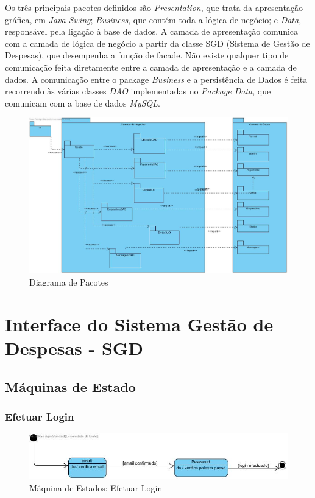 \newpage

Os três principais pacotes definidos são \textit{Presentation}, que trata da apresentação gráfica, em \textit{Java Swing}; \textit{Business}, que contém toda a lógica de negócio; e \textit{Data}, responsável pela ligação à base de dados. A camada de apresentação comunica com a camada de lógica de negócio a partir da classe
SGD (Sistema de Gestão de Despesas), que desempenha a função de facade.
Não existe qualquer tipo de comunicação feita diretamente entre a camada de
apresentação e a camada de dados. A comunicação entre o package \textit{Business}
e a persistência de Dados é feita recorrendo às várias classes \textit{DAO} implementadas no \textit{Package Data}, que comunicam com a base de dados \textit{MySQL}.

\begin{figure}[htb!]
	\centering
	\includegraphics[scale=0.35]{imagens/DiagramInstalacao/PackageDiagram}  
	\caption{Diagrama de Pacotes}  
\end{figure}

\newpage

\chapter{Interface do Sistema Gestão de Despesas - SGD}
\section{Máquinas de Estado}
\subsection{Efetuar Login}

\begin{figure}[htb!]
	\centering
	\includegraphics[scale=0.7]{imagens/maqEstados/Login}  
	\caption{Máquina de Estados: Efetuar Login}  
\end{figure}


